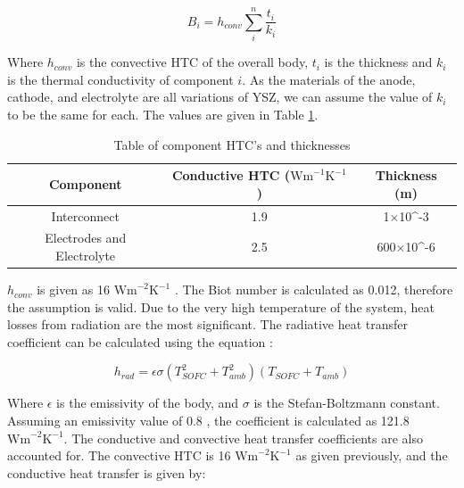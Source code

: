 \documentclass{article}
\begin{document}
\begin{equation}
 B_i=h_{conv} \sum\limits_{i}^n \frac{t_i}{k_i}  						
 \end{equation}
 
Where $h_{conv}$ is the convective HTC of the overall body, $t_i$ is the thickness and $k_i$ is the thermal conductivity of component $i$. As the materials of the anode, cathode, and electrolyte are all variations of YSZ, we can assume the value of $k_i$ to be the same for each. The values are given in Table \ref{tbl:HTCcoeff}.


\begin{table}[h!]
\centering
\caption{Table of component HTC's and thicknesses \cite{LM11} \cite{LM12}}
\label{tbl:HTCcoeff}
\begin{tabular}{|c|c|c|}
\hline
\textbf{Component}         & \textbf{Conductive HTC ($\text{Wm}^{-1}\text{K}^{-1}$)} & \textbf{Thickness (m)}     \\ \hline
Interconnect               & 1.9                               & 1$\times$10^{-3}   \\ \hline
Electrodes and Electrolyte & 2.5                               & 600$\times$10^{-6} \\ \hline
\end{tabular}
\end{table}


$h_{conv}$ is given as 16 $\text{Wm}^{-2} \text{K}^{-1}$ \cite{LM7}. The Biot number is calculated as 0.012, therefore the assumption is valid. Due to the very high temperature of the system, heat losses from radiation are the most significant. The radiative heat transfer coefficient can be calculated using the equation \cite{LM13}:

\begin{equation}
h_{rad}= \epsilon \sigma (T_{SOFC}^2 + T_{amb}^2)(T_{SOFC}+ T_{amb}) 			
 \end{equation}
 
Where $\epsilon$ is the emissivity of the body, and $\sigma$ is the Stefan-Boltzmann constant. Assuming an emissivity value of 0.8 \cite{LM7}, the coefficient is calculated as 121.8 $\text{Wm}^{-2}\text{K}^{-1}$. The conductive and convective heat transfer coefficients are also accounted for. The convective HTC is 16 $\text{Wm}^{-2}\text{K}^{-1}$ as given previously, and the conductive heat transfer is given by:
\end{document}
